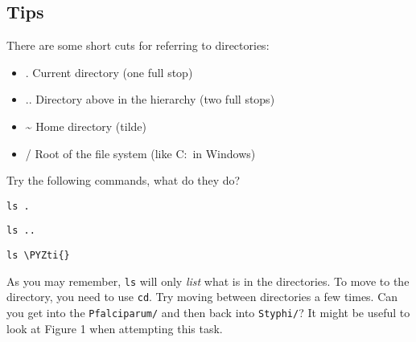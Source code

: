 \documentclass[11pt]{article}
\makeatletter
\providecommand{\tightlist}{%
      \setlength{\itemsep}{0pt}\setlength{\parskip}{0pt}}
\def\PYZti{\char`\~}
\newcommand{\boxspacing}{\kern\kvtcb@left@rule\kern\kvtcb@boxsep}
\newcommand{\prompt}[4]{
        {\ttfamily\llap{{\color{blue}\LARGE\faKeyboardO\hspace{3pt}#4}}\vspace{-\baselineskip}}
    }
\makeatother
\begin{document}
    \hypertarget{tips}{%
\subsection{Tips}\label{tips}}

There are some short cuts for referring to directories:

\begin{itemize}
\tightlist
\item
  . Current directory (one full stop)
\item
  .. Directory above in the hierarchy (two full stops)
\item
  \textasciitilde{} Home directory (tilde)
\item
  / Root of the file system (like C:~in Windows)
\end{itemize}

Try the following commands, what do they do?

    \begin{tcolorbox}[breakable, size=fbox, boxrule=1pt, pad at break*=1mm,colback=cellbackground, colframe=cellborder]
\prompt{In}{incolor}{ }{\boxspacing}
\begin{Verbatim}[commandchars=\\\{\}]
ls .
\end{Verbatim}
\end{tcolorbox}

    \begin{tcolorbox}[breakable, size=fbox, boxrule=1pt, pad at break*=1mm,colback=cellbackground, colframe=cellborder]
\prompt{In}{incolor}{ }{\boxspacing}
\begin{Verbatim}[commandchars=\\\{\}]
ls ..
\end{Verbatim}
\end{tcolorbox}

    \begin{tcolorbox}[breakable, size=fbox, boxrule=1pt, pad at break*=1mm,colback=cellbackground, colframe=cellborder]
\prompt{In}{incolor}{ }{\boxspacing}
\begin{Verbatim}[commandchars=\\\{\}]
ls \PYZti{}
\end{Verbatim}
\end{tcolorbox}

    As you may remember, \texttt{ls} will only \textit{list} what is in the
directories. To move to the directory, you need to use \texttt{cd}. Try
moving between directories a few times. Can you get into the
\texttt{Pfalciparum/} and then back into \texttt{Styphi/}? It might be
useful to look at Figure 1 when attempting this task.
\end{document}
